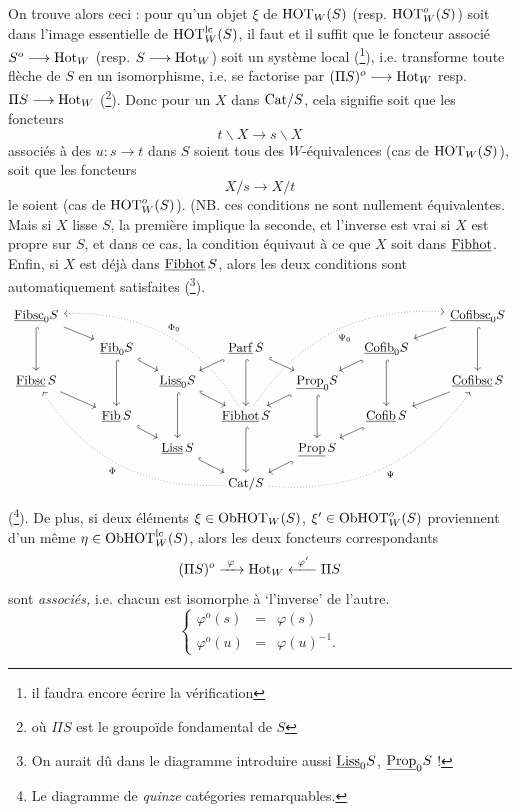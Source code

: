 On trouve alors ceci : pour qu'un objet $\xi$ de $\mathrm{HOT}_W(S)$ (resp. $\mathrm{HOT}^o_W(S)$) soit dans l'image essentielle de $\mathrm{HOT}^{\mathrm{lc}}_W(S)$, il faut et il suffit que le foncteur associé $S^o\longrightarrow\mathrm{Hot}_W$ (resp. $S\longrightarrow\mathrm{Hot}_W$) soit un système local (\footnote{il faudra encore écrire la vérification}), i.e. transforme toute flèche de $S$ en un isomorphisme, i.e. se factorise par $(\Pi S)^o\longrightarrow\mathrm{Hot}_W$ resp. $\Pi S\longrightarrow\mathrm{Hot}_W$ (\footnote{où $\Pi S$ est le groupoïde fondamental de $S$}). Donc pour un $X$ dans $\mathrm{Cat}/S$, cela signifie soit que les foncteurs
\[ t\backslash X\longrightarrow s\backslash X \]
associés à des $u : s\longrightarrow t$ dans $S$ soient tous des $W$-équivalences (cas de $\mathrm{HOT}_W(S)$), soit que les foncteurs
\[ X/s\longrightarrow X/t \]
le soient (cas de $\mathrm{HOT}^o_W(S)$). (NB. ces conditions ne sont nullement équivalentes. Mais si $X$ lisse $S$,
la première implique la seconde, et l'inverse est vrai si $X$ est propre sur $S$, et dans ce cas, la condition équivaut à ce que $X$ soit dans $\underline{\mathrm{Fibhot}}$. Enfin, si $X$ est déjà dans $\underline{\mathrm{Fibhot}}\,S$, alors les deux conditions sont automatiquement satisfaites (\footnote{On aurait dû dans le diagramme introduire aussi $\underline{\mathrm{Liss}}_0S$, $\underline{\mathrm{Prop}}_0S$ !}).
\[
\begin{tikzcd}[column sep=small, row sep=small]
\ul{Fibsc}_0S \arrow[dd,hook] \arrow[drr] & & & & & & & & \ul{Cofibsc}_0S \arrow[dll] \arrow[dd,hook] \\
 & & \ul{Fib}_0S \arrow[dd,hook] \arrow[dr,hook] & & \ul{Parf}\,S \arrow[dl,hook] \arrow[dd,hook] \arrow[dr,hook] & & \ul{Cofib}_0S \arrow[dl,hook] \arrow[dd,hook] & & \\
\ul{Fibsc}\,S \arrow[drr] & & & \ul{Liss}_0S \arrow[dr,hook] \arrow[dd,hook] & & \ul{Prop}_0S \arrow[dl,hook] \arrow[dd,hook] & & & \ul{Cofibsc}\,S \arrow[dll] \\
 & & \ul{Fib}\,S \arrow[dr,hook] & & \ul{Fibhot}\,S \arrow[dd,hook] \arrow[uuullll,dotted,bend right,"\Phi_0"'] \arrow[uuurrrr,dotted,bend left,"\Psi_0"'] & & \ul{Cofib}\,S \arrow[dl,hook] & & \\
 & & & \ul{Liss}\,S \arrow[dr,hook] & & \ul{Prop}\,S \arrow[dl,hook] & & & \\
 & & & & \Cat/S \arrow[uuullll,dotted,bend left,"\Phi"] \arrow[uuurrrr,dotted,bend right,"\Psi"'] & & & &
\end{tikzcd}
\]
(\footnote{Le diagramme de \textit{quinze} catégories remarquables.}). De plus, si deux éléments $\xi\in\mathrm{Ob}\mathrm{HOT}_W(S)$, $\xi'\in\mathrm{Ob}\mathrm{HOT}^o_W(S)$ proviennent d'un même $\eta\in\mathrm{Ob}\mathrm{HOT}^{\mathrm{lc}}_W(S)$, alors les deux foncteurs correspondants
\[ (\Pi S)^o\xrightarrow{\ \varphi\ }\Hot_W\xleftarrow{\ \varphi'\ }\Pi S \]
sont \textit{associés,} i.e. chacun est isomorphe à `l'inverse' de l'autre.
\[
\left\{
\begin{array}{lcl}
\varphi^o(s) & = & \varphi(s)\\
\varphi^o(u) & = & \varphi(u)^{-1}.
\end{array}
\right.
\]

